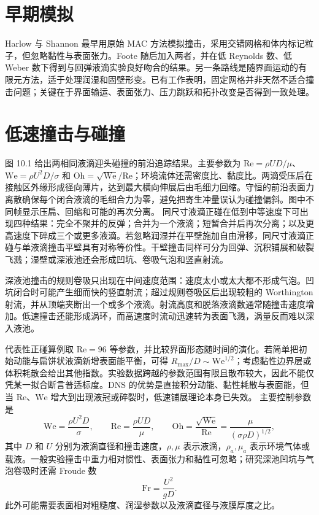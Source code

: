 \documentclass[11pt,a4paper,openany,fontset=none]{ctexbook}
\begin{document}
\section{早期模拟}

Harlow 与 Shannon 最早用原始 MAC 方法模拟撞击，采用交错网格和体内标记粒子，但忽略黏性与表面张力。Foote 随后加入两者，并在低 Reynolds 数、低 Weber 数下得到与回弹液滴实验良好吻合的结果。另一条路线是随界面运动的有限元方法，适于处理润湿和固壁形变。已有工作表明，固定网格并非天然不适合撞击问题；关键在于界面输运、表面张力、压力跳跃和拓扑改变是否得到一致处理。

\section{低速撞击与碰撞}

图 10.1 给出两相同液滴迎头碰撞的前沿追踪结果。主要参数为 $\mathrm{Re}=\rho UD/\mu$、$\mathrm{We}=\rho U^2D/\sigma$ 和 $\mathrm{Oh}=\sqrt{\mathrm{We}}/\mathrm{Re}$；环境流体还需密度比、黏度比。两滴受压后在接触区外缘形成径向薄片，达到最大横向伸展后由毛细力回缩。守恒的前沿表面力离散确保每个闭合液滴的毛细合力为零，避免把寄生冲量误认为碰撞偏斜。图中不同帧显示压扁、回缩和可能的再次分离。
同尺寸液滴正碰在低到中等速度下可出现四种结果：完全不聚并的反弹；合并为一个液滴；短暂合并后再次分离；以及更高速度下碎成三个或更多液滴。若忽略润湿并在平壁施加自由滑移，同尺寸液滴正碰与单液滴撞击平壁具有对称等价性。干壁撞击同样可分为回弹、沉积铺展和破裂飞溅；湿壁或深液池还会形成凹坑、卷吸气泡和竖直射流。

深液池撞击的规则卷吸只出现在中间速度范围：速度太小或太大都不形成气泡。凹坑闭合时可能产生细而快的竖直射流；超过规则卷吸区后出现较粗的 Worthington 射流，并从顶端夹断出一个或多个液滴。射流高度和脱落液滴数通常随撞击速度增加。低速撞击还能形成涡环，而高速度时流动迅速转为表面飞溅，涡量反而难以深入液池。

代表性正碰算例取 $\mathrm{Re}=96$ 等参数，并比较界面形态随时间的演化。若简单把初始动能与扁饼状液滴新增表面能平衡，可得 $R_{\max}/D\sim\mathrm{We}^{1/2}$；考虑黏性边界层或体积耗散会给出其他指数。实验数据跨越的参数范围有限且散布较大，因此不能仅凭某一拟合断言普适标度。DNS 的优势是直接积分动能、黏性耗散与表面能，但当 $\mathrm{Re}$、$\mathrm{We}$ 增大到出现液冠或碎裂时，低速铺展理论本身已失效。
主要控制参数是
\begin{equation}
 \mathrm{We}=\frac{\rho U^2D}{\sigma},
 \qquad
 \mathrm{Re}=\frac{\rho UD}{\mu},
 \qquad
 \mathrm{Oh}=\frac{\sqrt{\mathrm{We}}}{\mathrm{Re}}
 =\frac{\mu}{(\sigma\rho D)^{1/2}},
 \tag{10.1}
\end{equation}
其中 $D$ 和 $U$ 分别为液滴直径和撞击速度，$\rho,\mu$ 表示液滴，$\rho_a,\mu_a$ 表示环境气体或载液。一般实验撞击中重力相对惯性、表面张力和黏性可忽略；研究深池凹坑与气泡卷吸时还需 Froude 数
\begin{equation}
 \mathrm{Fr}=\frac{U^2}{gD}.
 \tag{10.2}
\end{equation}
此外可能需要表面相对粗糙度、润湿参数以及液滴直径与液膜厚度之比。
\end{document}
